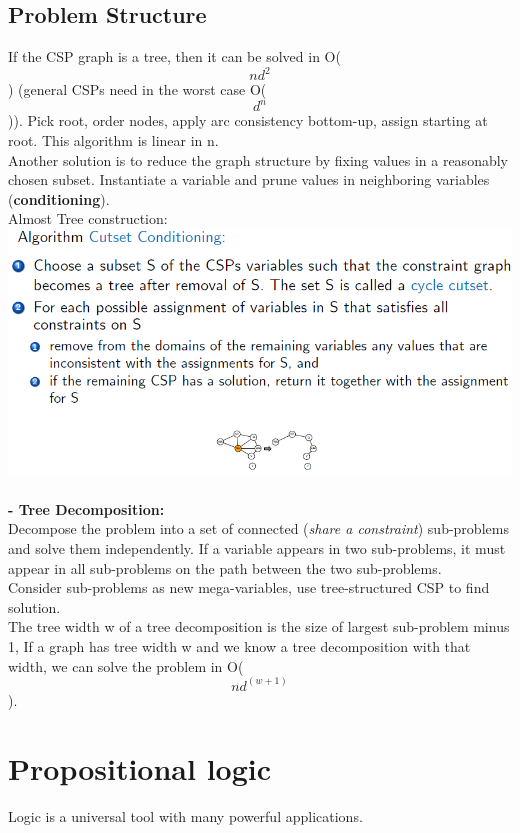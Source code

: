 \documentclass{article}
\begin{document}
\subsection{Problem Structure}
If the CSP graph is a tree, then it can be solved in O(\[nd^2\]) (general
CSPs need in the worst case O(\[d^n\] )). Pick root, order nodes, apply arc consistency bottom-up, assign starting at root. This algorithm is linear in n.\\
Another solution is to reduce the graph structure by fixing values in a reasonably chosen subset. Instantiate a variable and prune values in neighboring variables (\textbf{conditioning}).\\
Almost Tree construction:\\
\includegraphics[scale=0.6]{28.png}\\\\
\textbf{- Tree Decomposition: }\\
Decompose the problem into a set of connected (\textit{share a constraint}) sub-problems and solve them independently. If a variable appears in two sub-problems, it must appear in all sub-problems on the path between the two sub-problems.\\
Consider sub-problems as new mega-variables, use tree-structured CSP to find solution.\\
The tree width w of a tree decomposition is the size of largest sub-problem minus 1, If a graph has tree width w and we know a tree decomposition with that width, we can solve the problem in O(\[nd^(w+1)\]).\\    

\section{Propositional logic}
Logic is a universal tool with many powerful applications.\\
\end{document}
